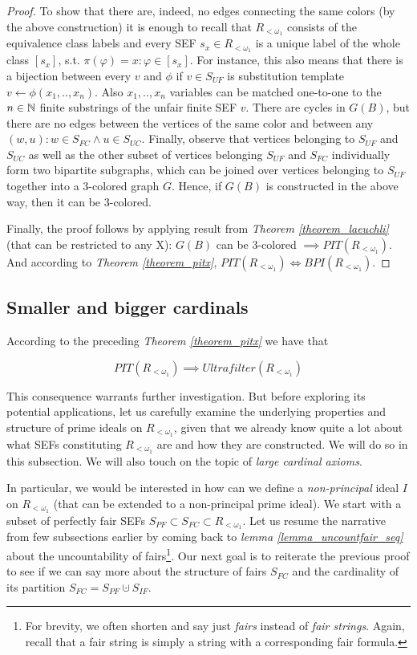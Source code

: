 \begin{proof}
  To show that there are, indeed, no edges connecting the same colors (by the above construction) it is enough to recall that $R_{<\omega_1}$ consists of the equivalence class labels and every SEF $s_x \in R_{<\omega_1}$ is a unique label of the whole class $[s_x]$, s.t. $\pi(\varphi) = x : \varphi \in [s_x]$. For instance, this also means that there is a bijection between every $v$ and $\phi$ if $v \in S_{UF}$ is substitution template $v \leftarrow \phi(x_1, .., x_n)$. Also $x_1, .., x_n$ variables can be matched one-to-one to the $n \in \mathbb{N}$ finite substrings of the unfair finite SEF $v$. There are cycles in $G(B)$, but there are no edges between the vertices of the same color and between any $(w, u): w \in S_{FC} \land u \in S_{UC}$. Finally, observe that vertices belonging to $S_{UF}$ and $S_{UC}$ as well as the other subset of vertices belonging $S_{UF}$ and $S_{FC}$ individually form two bipartite subgraphs, which can be joined over vertices belonging to $S_{UF}$ together into a 3-colored graph $G$. Hence, if $G(B)$ is constructed in the above way, then it can be 3-colored.
  
  Finally, the proof follows by applying result from \textit{Theorem \ref{theorem_laeuchli}} (that can be restricted to any X): $G(B)$ can be 3-colored $\implies PIT(R_{<\omega_1})$. And according to \textit{Theorem \ref{theorem_pitx}}, $PIT(R_{<\omega_1}) \Longleftrightarrow BPI(R_{<\omega_1})$.
\end{proof}



\subsection{Smaller and bigger cardinals}

According to the preceding \textit{Theorem \ref{theorem_pitx}} we have that 

\[ PIT(R_{<\omega_1}) \implies Ultrafilter(R_{<\omega_1}) \]

This consequence warrants further investigation. But before exploring its potential applications, let us carefully examine the underlying properties and structure of prime ideals on $R_{<\omega_1}$, given that we already know quite a lot about what SEFs constituting $R_{<\omega_1}$ are and how they are constructed. We will do so in this subsection. We will also touch on the topic of \textit{large cardinal axioms}.

In particular, we would be interested in how can we define a \textit{non-principal} ideal $I$ on $R_{<\omega_1}$ (that can be extended to a non-principal prime ideal). We start with a subset of perfectly fair SEFs $S_{PF} \subset S_{FC} \subset R_{<\omega_1}$. Let us resume the narrative from few subsections earlier by coming back to \textit{lemma \ref{lemma_uncountfair_seq}} about the uncountability of fairs\footnote{For brevity, we often shorten and say just \textit{fairs} instead of \textit{fair strings}. Again, recall that a fair string is simply a string with a corresponding fair formula.}. Our next goal is to reiterate the previous proof to see if we can say more about the structure of fairs $S_{FC}$ and the cardinality of its partition $S_{FC} = S_{PF} \cupdot S_{IF}$.


